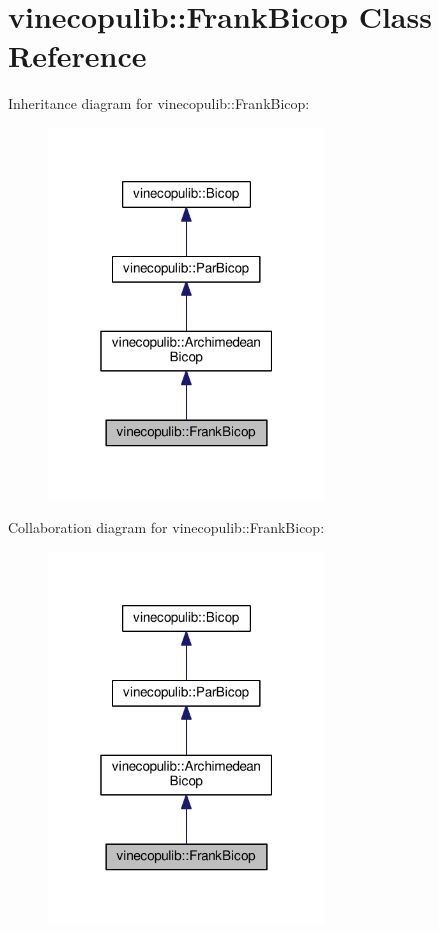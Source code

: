 \hypertarget{classvinecopulib_1_1_frank_bicop}{}\section{vinecopulib\+:\+:Frank\+Bicop Class Reference}
\label{classvinecopulib_1_1_frank_bicop}


Inheritance diagram for vinecopulib\+:\+:Frank\+Bicop\+:\nopagebreak
\begin{figure}[H]
\begin{center}
\leavevmode
\includegraphics[width=208pt]{classvinecopulib_1_1_frank_bicop__inherit__graph}
\end{center}
\end{figure}


Collaboration diagram for vinecopulib\+:\+:Frank\+Bicop\+:\nopagebreak
\begin{figure}[H]
\begin{center}
\leavevmode
\includegraphics[width=208pt]{classvinecopulib_1_1_frank_bicop__coll__graph}
\end{center}
\end{figure}
